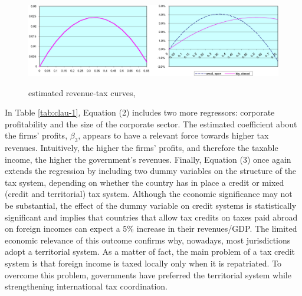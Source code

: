 \begin{figure}[!h]
    \centering
    \captionsetup{font=small}\caption{estimated revenue-tax curves, \cite{clausing}}
    \includegraphics[width=.85\textwidth]{img/clausing-rev-max.jpg}
    \label{clausing-img-2}
    \vspace{-2pt}
\end{figure}

In Table \ref{tab:clau-1}, Equation (2) includes two more regressors: corporate profitability and the size of the corporate sector. The estimated coefficient about the firms' profits, $\beta_3$, appears to have a relevant force towards higher tax revenues. Intuitively, the higher the firms' profits, and therefore the taxable income, the higher the government's revenues. Finally, Equation (3) once again extends the regression by including two dummy variables on the structure of the tax system, depending on whether the country has in place a credit or mixed (credit and territorial) tax system. Although the economic significance may not be substantial, the effect of the dummy variable on credit systems is statistically significant and implies that countries that allow tax credits on taxes paid abroad on foreign incomes can expect a 5\% increase in their revenues/GDP. The limited economic relevance of this outcome confirms why, nowadays, most jurisdictions adopt a territorial system. As a matter of fact, the main problem of a tax credit system is that foreign income is taxed locally only when it is repatriated.  To overcome this problem, governments have preferred the territorial system while strengthening international tax coordination.

